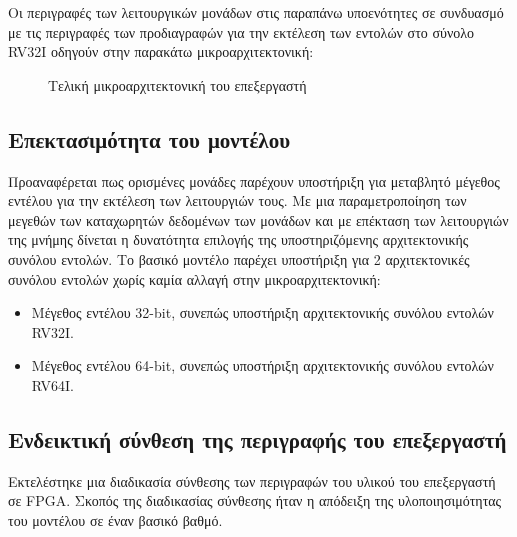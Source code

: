 \documentclass[11pt]{extarticle}
\begin{document}
Οι περιγραφές των λειτουργικών μονάδων στις παραπάνω υποενότητες σε συνδυασμό με τις περιγραφές των προδιαγραφών \cite{spec} για την εκτέλεση των εντολών στο σύνολο RV32I οδηγούν στην παρακάτω μικροαρχιτεκτονική:
\begin{figure}
    \centering
    \caption{Τελική μικροαρχιτεκτονική του επεξεργαστή}
\end{figure}

\newpage
\subsection{Επεκτασιμότητα του μοντέλου}
Προαναφέρεται πως ορισμένες μονάδες παρέχουν υποστήριξη για μεταβλητό μέγεθος εντέλου για την εκτέλεση των λειτουργιών τους.
Με μια παραμετροποίηση των μεγεθών των καταχωρητών δεδομένων των μονάδων και με επέκταση των λειτουργιών της μνήμης δίνεται η δυνατότητα επιλογής της υποστηριζόμενης αρχιτεκτονικής συνόλου εντολών.
Το βασικό μοντέλο παρέχει υποστήριξη για 2 αρχιτεκτονικές συνόλου εντολών χωρίς καμία αλλαγή στην μικροαρχιτεκτονική:
\begin{itemize}
    \item Μέγεθος εντέλου 32-bit, συνεπώς υποστήριξη αρχιτεκτονικής συνόλου εντολών RV32I.
    \item Μέγεθος εντέλου 64-bit, συνεπώς υποστήριξη αρχιτεκτονικής συνόλου εντολών RV64I.
\end{itemize}
\subsection{Ενδεικτική σύνθεση της περιγραφής του επεξεργαστή}
Εκτελέστηκε μια διαδικασία σύνθεσης των περιγραφών του υλικού του επεξεργαστή σε FPGA.
Σκοπός της διαδικασίας σύνθεσης ήταν η απόδειξη της υλοποιησιμότητας του μοντέλου σε έναν βασικό βαθμό.
\end{document}
